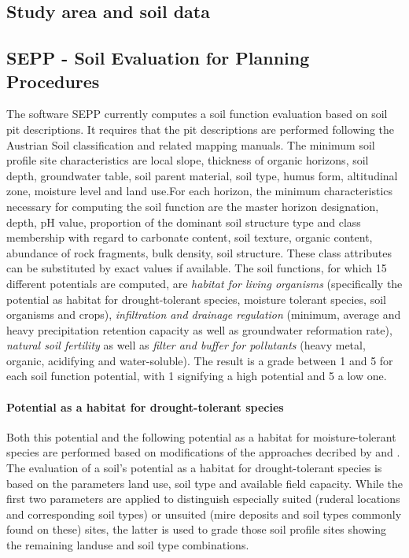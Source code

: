 \documentclass[preprint,12pt,authoryear]{elsarticle}
\begin{document}
\subsection{Study area and soil data}

\subsection{SEPP - Soil Evaluation for Planning Procedures}
The software SEPP currently computes a soil function evaluation based on soil pit descriptions. It requires that the pit descriptions are performed following the Austrian Soil classification  \citep{Nestroy2000,Nestroy2011} and related mapping manuals. The minimum  soil profile site characteristics are local slope, thickness of organic horizons, soil depth, groundwater table, soil parent material, soil type, humus form, altitudinal zone, moisture level and land use.For each horizon, the minimum characteristics necessary for computing the soil function are the master horizon designation, depth, pH value, proportion of the dominant soil structure type and class membership with regard to carbonate content, soil texture, organic content, abundance of rock fragments, bulk density, soil structure. These class attributes can be substituted by exact values if available. The soil functions, for which 15 different potentials are computed, are  \emph{habitat for living organisms} (specifically the potential as habitat for drought-tolerant species, moisture tolerant species, soil organisms and crops),  \emph{infiltration and drainage regulation} (minimum, average and heavy precipitation retention capacity as well as groundwater reformation rate), \emph{natural soil fertility} as well as \emph{filter and buffer for pollutants} (heavy metal, organic, acidifying and water-soluble). The result is a grade between 1 and 5 for each soil function potential, with 1 signifying a high potential and 5 a low one.

\paragraph{Potential as a habitat for drought-tolerant species} 
Both this potential and the following potential as a habitat for moisture-tolerant species are performed based on modifications of the approaches decribed by \cite{BAYGLA2003} and \cite{Lehmann2008}.
The evaluation of a soil's potential  as a habitat for drought-tolerant species is based on the parameters land use, soil type and available field capacity. While the first two parameters are applied to distinguish especially suited (ruderal locations and corresponding soil types) or unsuited (mire deposits and soil types commonly found on these) sites, the latter is used to grade those soil profile sites showing the remaining landuse and soil type combinations. 
\end{document}
